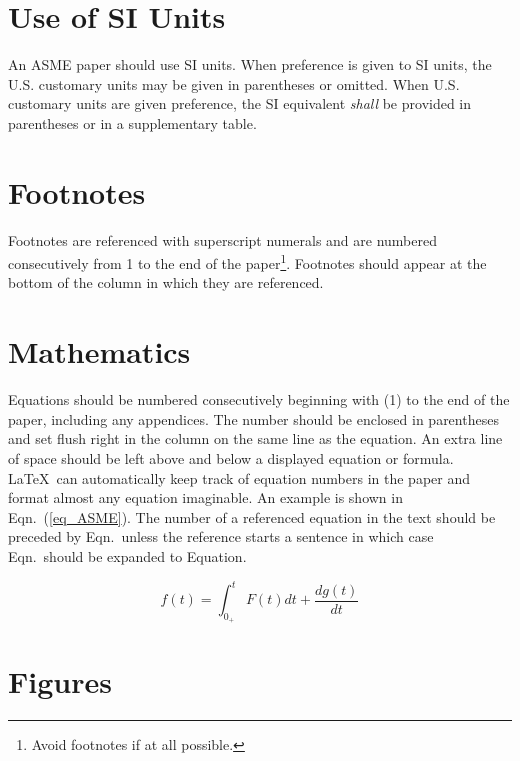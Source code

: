 \documentclass[10pt]{asme2ej}
\begin{document}
\section{Use of SI Units}

An ASME paper should use SI units.  When preference is given to SI units, the U.S. customary units may be given in parentheses or omitted. When U.S. customary units are given preference, the SI equivalent {\em shall} be provided in parentheses or in a supplementary table. 

\section{Footnotes\protect\footnotemark}

Footnotes are referenced with superscript numerals and are numbered consecutively from 1 to the end of the paper\footnote{Avoid footnotes if at all possible.}. Footnotes should appear at the bottom of the column in which they are referenced.


\section{Mathematics}

Equations should be numbered consecutively beginning with (1) to the end of the paper, including any appendices.  The number should be enclosed in parentheses and set flush right in the column on the same line as the equation.  An extra line of space should be left above and below a displayed equation or formula. \LaTeX\ can automatically keep track of equation numbers in the paper and format almost any equation imaginable. An example is shown in Eqn.~(\ref{eq_ASME}). The number of a referenced equation in the text should be preceded by Eqn.\ unless the reference starts a sentence in which case Eqn.\ should be expanded to Equation.

\begin{equation}
f(t) = \int_{0_+}^t F(t) dt + \frac{d g(t)}{d t}
\label{eq_ASME}
\end{equation}

\section{Figures}
\label{sect_figure}
\end{document}

